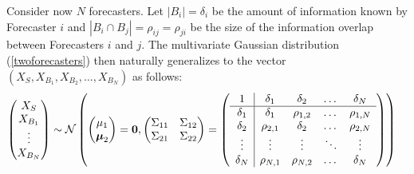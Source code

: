 \documentclass[11pt]{article}
\theoremstyle{definition}
\theoremstyle{definition}
\begin{document}
Consider now $N$ forecasters. Let $|B_i| = \delta_i$ be the amount of
information known by Forecaster $i$ and $|B_i
\cap B_j| = \rho_{ij} = \rho_{ji}$ be the size of the information overlap between
Forecasters $i$ and $j$. The multivariate Gaussian distribution (\ref{twoforecasters}) then naturally generalizes to the vector
$\left(X_{S}, X_{B_1}, X_{B_2}, \dots, X_{B_N}\right)$ as follows:
\begin{align}
\left(\begin{matrix} X_S \\ X_{B_1}\\ \vdots \\ X_{B_N} \end{matrix}\right) &\sim \mathcal{N}\left( \left(\begin{matrix} 
\mu_1 \\ \boldsymbol{\mu}_2
 \end{matrix}\right) =
 \boldsymbol{0}, \left(\begin{matrix} 
\Sigma_{11} & \Sigma_{12}\\
\Sigma_{21} & \Sigma_{22}\\
 \end{matrix}\right) 
 =
 \left(\begin{array}{c | c c cc }
1 & \delta_1 & \delta_2 & \dots & \delta_N  \\ \hline
\delta_1 & \delta_1 &\rho_{1,2} & \dots & \rho_{1,N}   \\ 
\delta_2 & \rho_{2,1} & \delta_2 & \dots & \rho_{2,N}  \\ 
\vdots & \vdots & \vdots & \ddots & \vdots  \\ 
\delta_N & \rho_{N,1} & \rho_{N,2} & \dots & \delta_N\\ 
 \end{array}\right)\right)  \label{Nforecasters}
\end{align}
\end{document}
